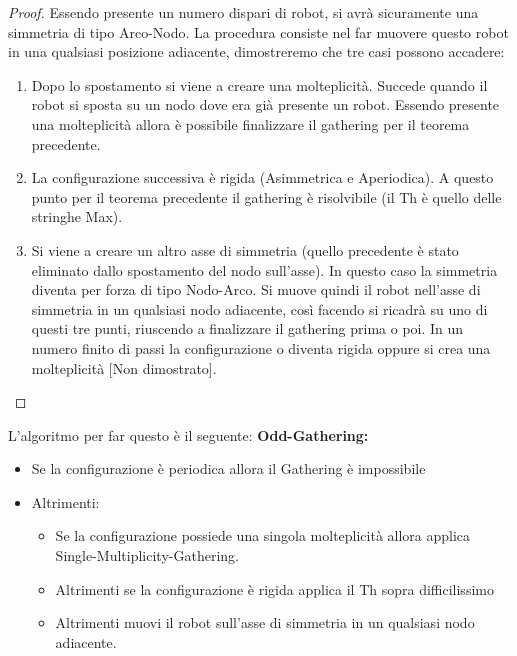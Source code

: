 \begin{proof}
Essendo presente un numero dispari di robot, si avrà sicuramente una simmetria di tipo Arco-Nodo. La procedura consiste nel far muovere questo robot in una qualsiasi posizione adiacente, dimostreremo che tre casi possono accadere:
\begin{enumerate}
    \item Dopo lo spostamento si viene a creare una molteplicità. Succede quando il robot si sposta su un nodo dove era già presente un robot. Essendo presente una molteplicità allora è possibile finalizzare il gathering per il teorema precedente.
    \item La configurazione successiva è rigida (Asimmetrica e Aperiodica). A questo punto per il teorema precedente il gathering è risolvibile (il Th è quello delle stringhe Max).
    \item Si viene a creare un altro asse di simmetria (quello precedente è stato eliminato dallo spostamento del nodo sull'asse). In questo caso la simmetria diventa per forza di tipo Nodo-Arco. Si muove quindi il robot nell'asse di simmetria in un qualsiasi nodo adiacente, così facendo si ricadrà su uno di questi tre punti, riuscendo a finalizzare il gathering prima o poi. In un numero finito di passi la configurazione o diventa rigida oppure si crea una molteplicità [Non dimostrato].
\end{enumerate}
\end{proof}
L'algoritmo per far questo è il seguente:
\textbf{Odd-Gathering:}
\begin{itemize}
    \item Se la configurazione è periodica allora il Gathering è impossibile
    \item Altrimenti:
    \begin{itemize}
        \item Se la configurazione possiede una singola molteplicità allora applica Single-Multiplicity-Gathering.
        \item Altrimenti se la configurazione è rigida applica il Th sopra difficilissimo
        \item Altrimenti muovi il robot sull'asse di simmetria in un qualsiasi nodo adiacente.
    \end{itemize}
\end{itemize}

